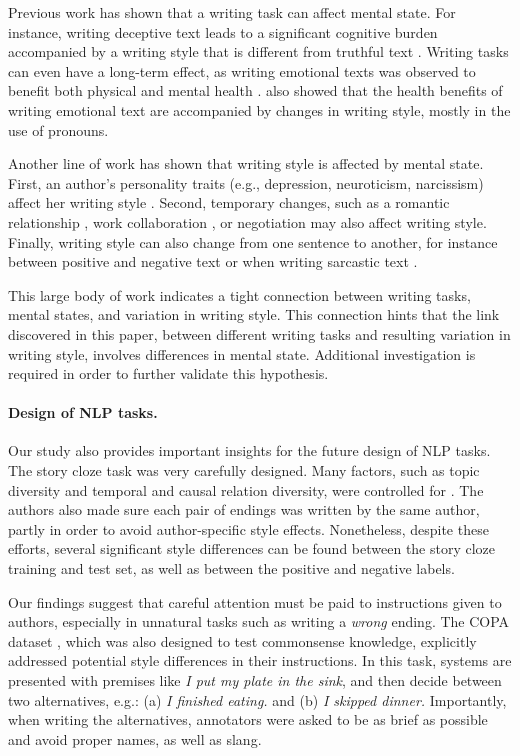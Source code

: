 \documentclass[11pt,a4paper]{article}
\newcommand{\roy}[1]{{\color{orange}\textsc{[#1 --rs]}}}
\renewcommand{\roy}[1]{{\color{orange}[#1 --rs]}}
\renewcommand{\roy}[1]{#1}
\begin{document}
Previous work has shown that a writing task can affect mental state.
For instance, writing deceptive text leads to a significant cognitive
burden accompanied by a writing style that is different from truthful
text \cite{Newman:2003,Banerjee:2014}.
Writing tasks can even have a long-term effect,
as writing emotional texts was observed to benefit both physical and mental health \cite{Lepore:2002,Frattaroli:2006}. 
\citet{Campbell:2003} also showed that the health benefits of writing emotional text are accompanied by changes in writing style, mostly in the use of pronouns.

Another line of work has shown that writing style is affected by mental state.
First, an author's personality traits (e.g., depression, neuroticism, narcissism) affect her writing style \cite{schwartz2013personality,Ireland:2014b}.
Second, temporary changes, such as a romantic relationship \cite{Ireland:2011,Bowen:2016}, work collaboration \cite{Tausczik:2009,Gonzales:2009}, or negotiation \cite{Ireland:2014} may also affect writing style.
Finally, writing style can also change from one sentence to another, for instance between positive and negative text \cite{Davidov:2010} or when writing sarcastic text \cite{Tsur:2010}. 

This large body of work indicates a tight connection between writing
tasks, mental states, and variation in writing style.
This connection hints that the link discovered in this paper, between
different writing tasks and resulting variation in writing style,
involves differences in mental state. 
Additional investigation is required in order to further validate this hypothesis.


\paragraph{Design of NLP tasks.}
Our study also provides important insights for the future design of NLP tasks. 
The story cloze task was very carefully designed. Many factors, such
as topic diversity and temporal and causal relation diversity,  were controlled for \cite{Mostafazadeh:2016}. 
The authors also made sure each pair of endings was written by the
same author, partly in order to avoid author-specific style effects.
 Nonetheless, despite these efforts, several significant style
 differences can be found between the story cloze training and test set, as well as between the positive and negative labels. 
 
Our findings suggest that careful attention must be paid to instructions given to authors, especially in unnatural tasks such as writing a {\it wrong} ending. 
\roy{The COPA dataset \cite{Roemmele:2011}, which was also designed to test commonsense knowledge, explicitly addressed potential style differences in their instructions. In this task,  systems are presented with premises like {\it I put my plate in the sink}, and then decide between two alternatives, e.g.: (a) {\it I finished eating.} and (b) {\it I skipped dinner.}}
Importantly, when writing the alternatives,  annotators were asked to be as brief as possible and avoid proper names, as well as  slang. 
\end{document}
